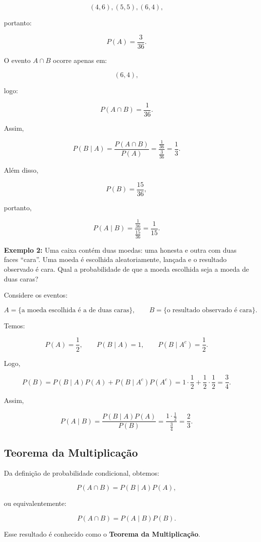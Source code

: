\[
(4,6),(5,5),(6,4),
\]

portanto:

\[
P(A)=\frac{3}{36}.
\]

O evento $A\cap B$ ocorre apenas em:

\[
(6,4),
\]

logo:

\[
P(A\cap B)=\frac{1}{36}.
\]

Assim,

\[
P(B\mid A)=\frac{P(A\cap B)}{P(A)}
=\frac{\frac{1}{36}}{\frac{3}{36}}=\frac{1}{3}.
\]

Além disso,

\[
P(B)=\frac{15}{36},
\]

portanto,

\[
P(A\mid B)=\frac{\frac{1}{36}}{\frac{15}{36}}=\frac{1}{15}.
\]

\textbf{Exemplo 2:} Uma caixa contém duas moedas: uma honesta e outra com duas faces ``cara''.
Uma moeda é escolhida aleatoriamente, lançada e o resultado observado é cara.
Qual a probabilidade de que a moeda escolhida seja a moeda de duas caras?\vskip0.3cm

Considere os eventos:

\[
A=\{\text{a moeda escolhida é a de duas caras}\},
\qquad
B=\{\text{o resultado observado é cara}\}.
\]

Temos:

\[
P(A)=\frac{1}{2},\qquad
P(B\mid A)=1,\qquad
P(B\mid A^c)=\frac{1}{2}.
\]

Logo,

\[
P(B)=P(B\mid A)P(A)+P(B\mid A^c)P(A^c)
=1\cdot\frac{1}{2}+\frac{1}{2}\cdot\frac{1}{2}
=\frac{3}{4}.
\]

Assim,

\[
P(A\mid B)=\frac{P(B\mid A)P(A)}{P(B)}
=\frac{1\cdot\frac{1}{2}}{\frac{3}{4}}
=\frac{2}{3}.
\]

\subsection{Teorema da Multiplicação}

Da definição de probabilidade condicional, obtemos:

\[
P(A\cap B)=P(B\mid A)P(A),
\]

ou equivalentemente:

\[
P(A\cap B)=P(A\mid B)P(B).
\]

Esse resultado é conhecido como o \textbf{Teorema da Multiplicação}.\vskip0.3cm

